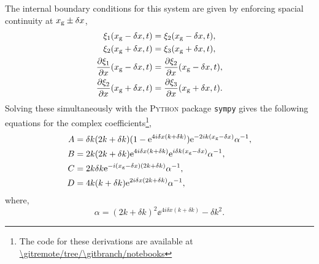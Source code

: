 The internal boundary conditions for this system are given by enforcing spacial continuity at \(x_{{\mathrm{g}}} \pm \delta x\),
%
\begin{equation}
    \begin{split}
        \xi_1(x_{{\mathrm{g}}} - \delta x, t) &= \xi_2(x_{{\mathrm{g}}} - \delta x, t), \\
        \xi_2(x_{{\mathrm{g}}} + \delta x, t) &= \xi_3(x_{{\mathrm{g}}} + \delta x, t), \\
        \frac{\partial \xi_1}{\partial x}(x_{{\mathrm{g}}} - \delta x, t) &= \frac{\partial \xi_2}{\partial x}(x_{{\mathrm{g}}} - \delta x, t), \\
        \frac{\partial \xi_2}{\partial x}(x_{{\mathrm{g}}} + \delta x, t) &= \frac{\partial \xi_3}{\partial x}(x_{{\mathrm{g}}} + \delta x, t).
    \end{split}
\end{equation}
%
Solving these simultaneously with the \textsc{Python} package \texttt{sympy} \citep{Meurer.Smith.ea2017} gives the following equations for the complex coefficients\footnote{The code for these derivations are available at \url{\gitremote/tree/\gitbranch/notebooks}},
%
\begin{align}
    A &= \delta k (2k + \delta k) (1 - \mathrm{e}^{4i \delta x (k + \delta k)}) \mathrm{e}^{- 2i k (x_{{\mathrm{g}}} - \delta x)} \alpha^{-1}, \\
    B &= 2 k (2k + \delta k) \mathrm{e}^{4i \delta x (k + \delta k)} \mathrm{e}^{i \delta k (x_{{\mathrm{g}}} - \delta x)} \alpha^{-1}, \\
    C &= 2 k \delta k \mathrm{e}^{- i (x_{{\mathrm{g}}} - \delta x) (2k + \delta k)} \alpha^{-1}, \\
    D &= 4 k (k + \delta k) \mathrm{e}^{2 i \delta x (2k + \delta k)} \alpha^{-1},
\end{align}
%
where,
\begin{equation}
    \alpha = (2k + \delta k)^2 \ee^{4 i \delta x (k + \delta k)} - \delta k^2.
\end{equation}
%

